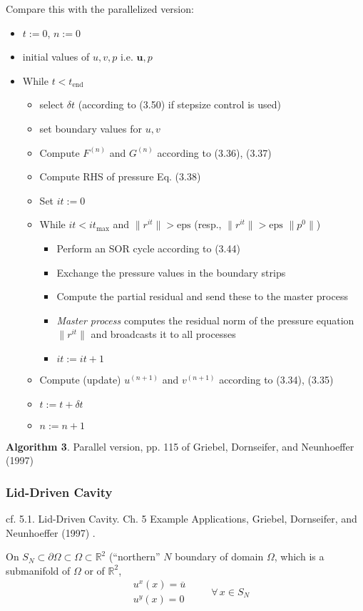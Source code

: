 \documentclass[10pt]{amsart}
\begin{document}
\begin{multicols*}{2}
Compare this with the parallelized version:
\begin{itemize}
  \item $t:=0$, $n:= 0$ 
  \item initial values of $u,v, p$ i.e. $\mathbf{u},p$
  \item While $t<t_{\text{end}}$ \begin{itemize}
  \item select $\delta t$ (according to (3.50) if stepsize control is used)
  \item set boundary values for $u,v$
  \item Compute $F^{(n)}$ and $G^{(n)}$ according to (3.36), (3.37)
  \item Compute RHS of pressure Eq. (3.38)
  \item Set $it := 0$ 
  \item While $it < it_{\text{max}}$ and $\| r^{it} \| > \text{eps} $ (resp., $\|r^{it} \| > \text{eps } \| p^0 \|$) \begin{itemize}
    \item Perform an SOR cycle according to (3.44) 
    \item Exchange the pressure values in the boundary strips
    \item Compute the partial residual and send these to the master process
    \item \emph{Master process} computes the residual norm of the pressure equation $\|r^{it}\|$ and broadcasts it to all processes
      \item $it:= it +1$
  \end{itemize}
 \item   Compute (update) $u^{(n+1)}$ and $v^{(n+1)}$ according to (3.34), (3.35)
 \item $t:= t+ \delta t$ 
\item $n := n+1$
  \end{itemize}
\end{itemize}
\textbf{Algorithm 3}. Parallel version, pp. 115 of Griebel, Dornseifer, and Neunhoeffer (1997) \cite{GDN1997}



 
\subsubsection{Lid-Driven Cavity}

cf. 5.1. Lid-Driven Cavity.   Ch. 5 Example Applications, Griebel, Dornseifer, and Neunhoeffer (1997) \cite{GDN1997}.

On $S_N \subset \partial \Omega \subset \Omega \subset \mathbb{R}^2$ (``northern'' $N$ boundary of domain $\Omega$, which is a submanifold of $\Omega$ or of $\mathbb{R}^2$,
\begin{equation}
\begin{aligned}
  & u^x(x) = \overline{u} \\ 
  & u^y(x) = 0 
  \end{aligned} \qquad \, \forall \, x \in S_N
\end{equation}


\end{multicols*}
\end{document}
